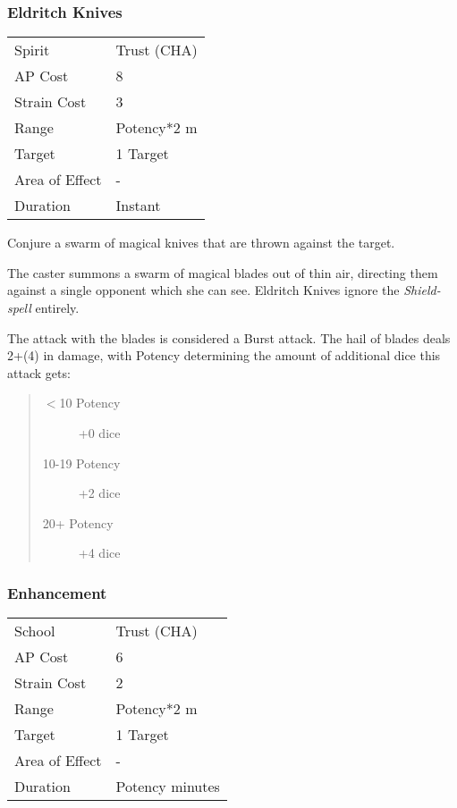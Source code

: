 \documentclass[11pt,a4paper,twocolumn]{book}
\begin{document}
\subsubsection*{Eldritch Knives}
{
	\begin{tabu} to 75mm{| X[l,4] | X[l,7] |}
		\hline
		Spirit         & Trust (CHA) \\
		AP Cost        & 8           \\
		Strain Cost    & 3           \\
		Range          & Potency*2 m \\
		Target         & 1 Target    \\
		Area of Effect & -           \\
		Duration       & Instant     \\ \hline
	\end{tabu}
	
}

\medskip

Conjure a swarm of magical knives that are thrown against the target.

The caster summons a swarm of magical blades out of thin air, directing them against a single opponent which she can see. Eldritch Knives ignore the \textit{Shield-spell} entirely.

The attack with the blades is considered a Burst attack. The hail of blades deals 2+(4) in damage, with Potency determining the amount of additional dice this attack gets:

\begin{quote}
	\begin{description}
		\item[$<$10 Potency] 	+0 dice
		\item[10-19 Potency] 	+2 dice
		\item[20+ Potency] 	    +4 dice
	\end{description}
\end{quote}




\subsubsection*{Enhancement}
{
	\begin{tabu} to 75mm{| X[l,4] | X[l,7] |}
		\hline
		School 			& Trust (CHA) 		\\
		AP Cost	      	& 6 					\\
		Strain Cost     & 2 					\\
		Range     		& Potency*2 m			\\
		Target      	& 1 Target				\\
		Area of Effect  & -  	 				\\
		Duration     	& Potency minutes 		\\ \hline
	\end{tabu}
	
}
\end{document}
